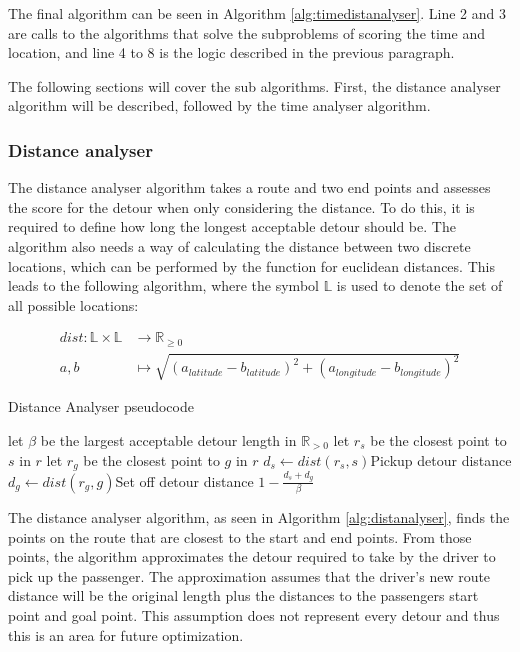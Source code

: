 The final algorithm can be seen in Algorithm \ref{alg:timedistanalyser}.
Line 2 and 3 are calls to the algorithms that solve the subproblems of scoring the time and location, and line 4 to 8 is the logic described in the previous paragraph.

The following sections will cover the sub algorithms.
First, the distance analyser algorithm will be described, followed by the time analyser algorithm.

\subsubsection{Distance analyser}
The distance analyser algorithm takes a route and two end points and assesses the score for the detour when only considering the distance.
To do this, it is required to define how long the longest acceptable detour should be.
The algorithm also needs a way of calculating the distance between two discrete locations, which can be performed by the function for euclidean distances.
This leads to the following algorithm, where the symbol $\mathbb{L}$ is used to denote the set of all possible locations:

\begin{align*}
	dist : \mathbb{L}\times\mathbb{L} &\rightarrow \mathbb{R}_{\geq 0}\\
	a, b &\mapsto \sqrt{(a_{latitude} - b_{latitude})^2 + (a_{longitude} - b_{longitude})^2}
\end{align*}

\begin{algorithm}
	\caption{Distance Analyser pseudocode}
	\label{alg:distanalyser}
	\begin{algorithmic}[1]
		\Require 
		\Statex let $\beta$ be the largest acceptable detour length in $\mathbb{R}_{>0}$ 
		\Statex 
			\State let $r_s$ be the closest point to $s$ in $r$
			\State let $r_g$ be the closest point to $g$ in $r$
			\State $d_s\gets dist(r_s, s)$\Comment Pickup detour distance
			\State $d_g\gets dist(r_g, g)$\Comment Set off detour distance
			\State\Return $1-\frac{d_s + d_g}{\beta}$
		\EndFunction
	\end{algorithmic}
\end{algorithm}

The distance analyser algorithm, as seen in Algorithm \ref{alg:distanalyser}, finds the points on the route that are closest to the start and end points.
From those points, the algorithm approximates the detour required to take by the driver to pick up the passenger.
The approximation assumes that the driver's new route distance will be the original length plus the distances to the passengers start point and goal point.
This assumption does not represent every detour and thus this is an area for future optimization.

